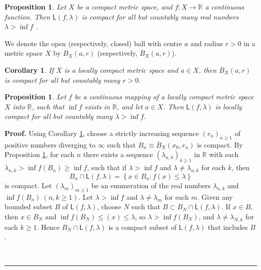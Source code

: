\documentclass[11pt]{article}%
\newtheorem{corollary}[theorem]{Corollary}
\newtheorem{proposition}[theorem]{Proposition}
\newenvironment{proof}[1][Proof]{\noindent\textbf{#1.} }{\ \rule{0.5em}{0.5em}}
\begin{document}
\begin{proposition}
\label{Bisha}Let $X$ be a compact metric space, and $f:X\rightarrow\mathbb{R}$
a continuous function. Then $\mathsf{L}\left(  f,\lambda\right)  $ is compact
for all but countably many real numbers $\lambda>\inf f$ \emph{\cite[Ch. 4,
(4.9)]{BB}}.
\end{proposition}

%

\medskip


We denote the open (respectively, closed) ball with centre $a$ and radius
$r>0$ in a metric space $X$ by $B_{X}(a,r)$ (respectively, $\overline{B}%
_{X}(a,r)$).

\begin{corollary}
\label{may26c1}If $X$ is a locally compact metric space and $a\in X$, then
$\overline{B}_{X}(a,r)$ is compact for all but countably many $r>0$.
\end{corollary}

\begin{proposition}
\label{may23p1}Let $f$ be a continuous mapping of a locally compact metric
space $X$ into $\mathbb{R}$, such that $\inf f$ exists in $\mathbb{R}$, and
let $a\in X$. Then $\mathsf{L}(f,\lambda)$ is locally compact for all but
countably many $\lambda>\inf f$.
\end{proposition}

\begin{proof}
Using Corollary \ref{may26c1}, choose a strictly increasing sequence $\left(
r_{n}\right)  _{n\geqslant1}$ of positive numbers diverging to $\infty$ such
that $B_{n}\equiv\overline{B}_{X}\left(  x_{0},r_{n}\right)  $ is compact. By
Proposition \ref{Bisha}, for each $n$ there exists a sequence $\left(
\lambda_{n,k}\right)  _{k\geqslant1}$ in $\mathbb{R}$ with each $\lambda
_{n,k}>\inf f(B_{n})\geqslant\inf f$, such that if $\lambda>\inf f$ and
$\lambda\neq\lambda_{n,k}$ for each $k$, then
\[
B_{n}\cap\mathsf{L}(f,\lambda)=\left\{  x\in B_{n}:f(x)\leqslant
\lambda\right\}
\]
is compact. Let $\left(  \lambda_{m}\right)  _{m\geqslant1}$ be an enumeration
of the real numbers $\lambda_{n,k}$ and $\inf f(B_{n})\ \left(  n,k\geqslant
1\right)  $. Let $\lambda>\inf f$ and $\lambda\neq\lambda_{m}$ for each $m$.
Given any bounded subset $B$ of $\mathsf{L}(f,\lambda)$, choose $N$ such that
$B\subset B_{N}\cap\mathsf{L}(f,\lambda)$. If $x\in B$, then $x\in B_{N}$ and
$\inf f(B_{N})\leqslant(x)\leqslant\lambda$, so $\lambda>\inf f(B_{N})$, and
$\lambda\neq\lambda_{N,k}$ for each $k\geqslant1$. Hence $B_{N}\cap
\mathsf{L}(f,\lambda)$ is a compact subset of $\mathsf{L}(f,\lambda)$ that
includes $B$.%

\hfill

\end{proof}
\end{document}
